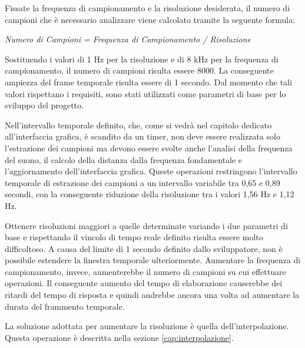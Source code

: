 \begin{comment}
Aumentare la precisione richiede l'elaborazione di un maggior numero di campioni per ciascun frammento temporale. 
Ci sono due modi per ottenere tale effetto: aumentare la frequenza di campionamento oppure aumentare la finestra temporale.
In entrambi i casi, aumentare la precisione dell'analisi è in contrasto con il requisito di tempo reale.
Risulta necessario quindi effettuare una mediazione tra i due requisiti.
\end{comment}

Fissate la frequenza di campionamento e la risoluzione desiderata, il numero di campioni che è necessario analizzare viene calcolato tramite la seguente formula:

\vspace{0.2cm}
\centerline{\textit{Numero di Campioni = Frequenza di Campionamento / Risoluzione}}
\vspace{0.2cm}

Sostituendo i valori di 1 Hz per la risoluzione e di 8 kHz per la frequenza di campionamento, il numero di campioni risulta essere 8000. 
La conseguente ampiezza del frame temporale risulta essere di 1 secondo.
Dal momento che tali valori rispettano i requisiti, sono stati utilizzati come parametri di base per lo sviluppo del progetto.

Nell'intervallo temporale definito, che, come si vedrà nel capitolo dedicato all'interfaccia grafica, è scandito da un timer, non deve essere realizzata solo l'estrazione dei campioni ma devono essere svolte anche l'analisi della frequenza del suono, il calcolo della distanza dalla frequenza fondamentale e l'aggiornamento dell'interfaccia grafica. 
Queste operazioni restringono l'intervallo temporale di estrazione dei campioni a un intervallo variabile tra 0,65 e 0,89 secondi, con la conseguente riduzione della risoluzione tra i valori 1,56 Hz e 1,12 Hz.

Ottenere risoluzioni maggiori a quelle determinate variando i due parametri di base e rispettando il vincolo di tempo reale definito risulta essere molto difficoltoso. 
A causa del limite di 1 secondo definito dallo sviluppatore, non è possibile estendere la finestra temporale ulteriormente.
Aumentare la frequenza di campionamento, invece, aumenterebbe il numero di campioni su cui effettuare operazioni. 
Il conseguente aumento del tempo di elaborazione causerebbe dei ritardi del tempo di risposta e quindi andrebbe ancora una volta ad aumentare la durata del frammento temporale.

La soluzione adottata per aumentare la risoluzione è quella dell'interpolazione.
Questa operazione è descritta nella sezione \ref{cap:interpolazione}.

